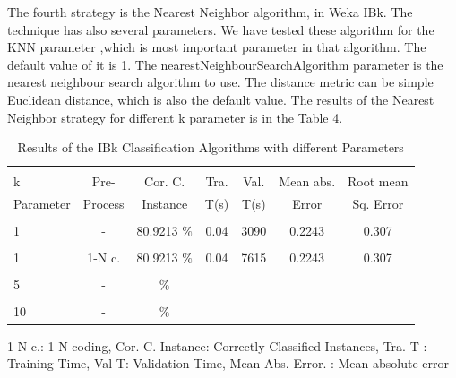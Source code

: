 \documentclass[a4paper]{article}
\begin{document}
The fourth strategy is the  Nearest Neighbor algorithm, in Weka IBk. The technique has also several parameters. We have tested these algorithm for the KNN parameter ,which is most important parameter in that algorithm. The default value of it is 1. The nearestNeighbourSearchAlgorithm parameter is the nearest neighbour search algorithm to use. The distance metric can be simple Euclidean distance, which is also the default value. The results of the  Nearest Neighbor  strategy for different k parameter is in the Table 4.

\begin{table}
\begin{tabular}{|l| c | c | c | c |c |c |}

\hline & & & & & & \\
k &  Pre- & Cor. C. & Tra. & Val. & Mean abs.  & Root mean \\
Parameter& Process & Instance & T(s) &  T(s) & Error & Sq. Error \\
\hline & & & & & & \\
1 	 & - &			80.9213		   $\%$ &	0.04		& 	3090	 & 	0.2243	 & 0.307  \\ 
\hline & & & & & & \\	
1 	 & 1-N c.  &		 80.9213		   $\%$ &	0.04		& 	7615	 & 	 0.2243	 &  0.307  \\ 
\hline & & & & & & \\
5	 & - &		  			 $\%$ &			& 		 & 		 &  \\ 
\hline & & & & & & \\	
10	 & - &		  			 $\%$ &			& 		 & 		 &  \\ 
\hline
\end{tabular}
\caption{Results of the IBk Classification Algorithms with different Parameters}
	 1-N c.: 1-N coding,
	Cor. C. Instance:  Correctly Classified Instances,
	Tra. T : Training Time,
	Val T: Validation Time,
	Mean Abs. Error. : Mean absolute error 
\end{table}
\end{document}
